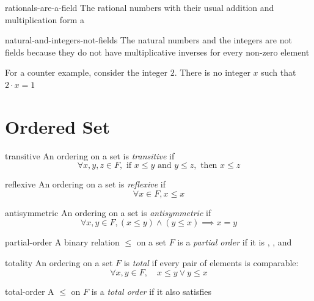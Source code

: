 \documentclass[12pt]{article}
\begin{document}
\begin{prop}[\(\QQ\) Is a Field]{rationals-are-a-field}
The rational numbers with their usual addition and multiplication form a
\end{prop}

\begin{rem}{natural-and-integers-not-fields}
The natural numbers and the integers are not fields because they do not have
multiplicative inverses for every non-zero element

For a counter example, consider the integer \(2\). There is no integer \(x\) such that \(2 \cdot x = 1\) 
\end{rem}

\section{Ordered Set} 

\begin{dfn}[Transitive]{transitive}
An ordering on a set is \emph{transitive} if 
\[ \forall x, y, z \in F, \text{ if } x \le y \text{ and } y \le z, \text{ then } x \le z \]
\end{dfn}

\begin{dfn}[Reflexive]{reflexive}
An ordering on a set is \emph{reflexive} if
\[ \forall x \in F, x \leq x \]
\end{dfn}

\begin{dfn}[Antisymmetric]{antisymmetric}
An ordering on a set is \emph{antisymmetric} if
\[ \forall x, y \in F, (x \le y) \land (y \le x) \implies x = y \]
\end{dfn} 

\begin{dfn}{partial-order}
A binary relation \(\leq\) on a set \(F\) is a \emph{partial order} if it is
, , and
\end{dfn}

\begin{dfn}[Totality]{totality}
An ordering on a set \(F\) is \emph{total} if every pair of elements is
comparable:
\[
  \forall x,y\in F,\quad x\leq y\lor y\leq x
\]
\end{dfn}

\begin{dfn}{total-order}
  A  \(\leq\) on \(F\) is a
  \emph{total order} if it also satisfies 
\end{dfn}
\end{document}
